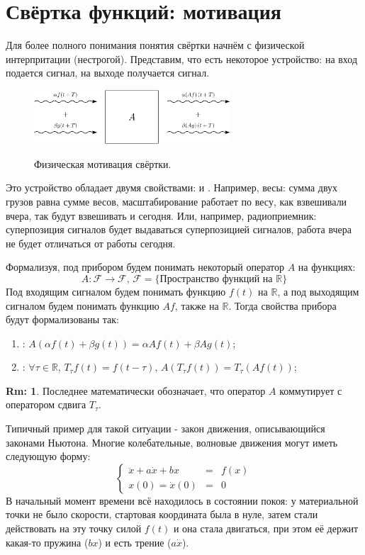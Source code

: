 \documentclass[12pt]{article}
\newcommand{\RN}[1]{%
	\textup{\uppercase\expandafter{\romannumeral#1}}%
}
\newcommand{\MR}{\mathbb{R}}
\theoremstyle{definition}
\newtheorem{rem}{Rm:}
\begin{document}
\lhead{Математический анализ - \RN{3}}
\section*{Свёртка функций: мотивация} 
Для более полного понимания понятия свёртки начнём с физической интерпритации (нестрогой). Представим, что есть некоторое устройство: на вход подается сигнал, на выходе получается сигнал. 
\begin{figure}[H]
	\centering
	\includegraphics[width=0.65\textwidth]{MA3L25_1.eps}
	\label{MA3L25_1}
	\caption{Физическая мотивация свёртки.}
	\label{fig: свёртка}
\end{figure}
Это устройство обладает двумя свойствами:  и . Например, весы: сумма двух грузов равна сумме весов, масштабирование работает по весу, как взвешивали вчера, так будут взвешивать и сегодня. Или, например, радиоприемник: суперпозиция сигналов будет выдаваться суперпозицией сигналов, работа вчера не будет отличаться от работы сегодня.

Формализуя, под прибором будем понимать некоторый оператор $A$ на функциях:
$$
	A \colon \mathcal{F} \to \mathcal {F}, \, \mathcal{F} =\{\text{Пространство функций на } \MR\}
$$
Под входящим сигналом будем понимать функцию $f(t)$ на $\MR$, а под выходящим сигналом будем понимать функцию $Af$, также на $\MR$. Тогда свойства прибора будут формализованы так:
\begin{enumerate}[label=(\arabic*)]
	\item {}: $A(\alpha f(t) + \beta g(t)) =\alpha Af(t) + \beta Ag(t)$;
	\item {}: $\forall \tau \in \MR, \, T_\tau f(t) = f(t - \tau), \, A(T_\tau f(t)) = T_\tau (Af(t))$;
\end{enumerate}
\begin{rem}
	Последнее математически обозначает, что оператор $A$ коммутирует с оператором сдвига $T_\tau$.
\end{rem}
Типичный пример для такой ситуации - закон движения, описывающийся законами Ньютона. Многие колебательные, волновые движения могут иметь следующую форму:
$$
	\left\{
	\begin{array}{lcc}
		\ddot{x} + a\dot{x} + bx &=& f(x)\\
		x(0) = \dot{x}(0) &=& 0
	\end{array}
	\right.	
$$
В начальный момент времени всё находилось в состоянии покоя: у материальной точки не было скорости, стартовая координата была в нуле, затем стали действовать на эту точку силой $f(t)$ и она стала двигаться, при этом её держит какая-то пружина ($bx$) и есть трение ($a \dot{x}$). 
\end{document}
